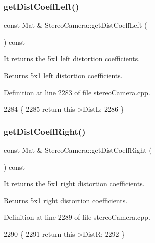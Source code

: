 \subsubsection{\texorpdfstring{get\+Dist\+Coeff\+Left()}{getDistCoeffLeft()}}
{\footnotesize\ttfamily const Mat \& Stereo\+Camera\+::get\+Dist\+Coeff\+Left (\begin{DoxyParamCaption}{ }\end{DoxyParamCaption}) const}



It returns the 5x1 left distortion coefficients. 

\begin{DoxyReturn}{Returns}
5x1 left distortion coefficients. 
\end{DoxyReturn}


Definition at line 2283 of file stereo\+Camera.\+cpp.


\begin{DoxyCode}
2284 \{
2285     \textcolor{keywordflow}{return} this->DistL;
2286 \}
\end{DoxyCode}
\mbox{\label{classStereoCamera_a589ca8eb4ebfc4377589a77bb15b85b7}} 
\subsubsection{\texorpdfstring{get\+Dist\+Coeff\+Right()}{getDistCoeffRight()}}
{\footnotesize\ttfamily const Mat \& Stereo\+Camera\+::get\+Dist\+Coeff\+Right (\begin{DoxyParamCaption}{ }\end{DoxyParamCaption}) const}



It returns the 5x1 right distortion coefficients. 

\begin{DoxyReturn}{Returns}
5x1 right distortion coefficients. 
\end{DoxyReturn}


Definition at line 2289 of file stereo\+Camera.\+cpp.


\begin{DoxyCode}
2290 \{
2291     \textcolor{keywordflow}{return} this->DistR;
2292 \}
\end{DoxyCode}
\mbox{\label{classStereoCamera_af64550bb8a7a665930dee5eea87b7e47}} 
